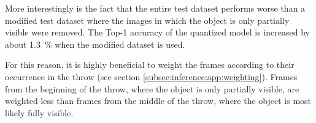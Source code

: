 More interestingly is the fact that the entire test dataset performs worse than a modified test dataset where the images in which the object is only partially visible were removed.
The Top-1 accuracy of the quantized model is increased by about \SI{1.3}{\percent} when the modified dataset is used.

For this reason, it is highly beneficial to weight the frames according to their occurrence in the throw (see section \ref{subsec:inference:app:weighting}). %
Frames from the beginning of the throw, where the object is only partially visible, are weighted less than frames from the middle of the throw, where the object is most likely fully visible.
